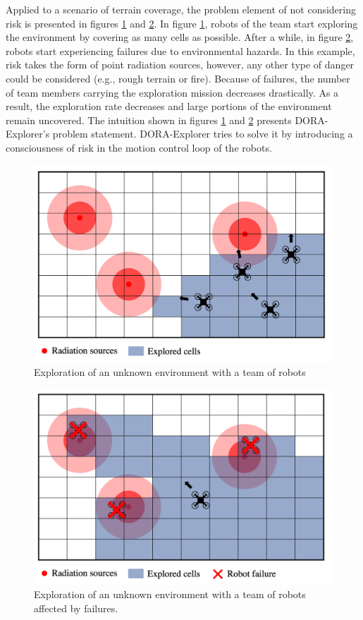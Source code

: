 Applied to a scenario of terrain coverage, the problem element of not considering risk is presented in figures \ref{statementDORA1} and \ref{statementDORA2}. In figure \ref{statementDORA1}, robots of the team start exploring the environment by covering as many cells as possible. After a while, in figure \ref{statementDORA2}, robots start experiencing failures due to environmental hazards. In this example, risk takes the form of point radiation sources, however, any other type of danger could be considered (e.g., rough terrain or fire). Because of failures, the number of team members carrying the exploration mission decreases drastically. As a result, the exploration rate decreases and large portions of the environment remain uncovered. The intuition shown in figures \ref{statementDORA1} and \ref{statementDORA2} presents DORA-Explorer's problem statement. DORA-Explorer tries to solve it by introducing a consciousness of risk in the motion control loop of the robots. 

\begin{figure}[htbp]
	\centering
    \includegraphics[width=0.70\columnwidth]{images/problemStatement1.png}
    \caption{Exploration of an unknown environment with a team of robots}
    \label{statementDORA1}
\end{figure}

\begin{figure}[htbp]
	\centering
    \includegraphics[width=0.70\columnwidth]{images/problemStatement2.png}
    \caption{Exploration of an unknown environment with a team of robots affected by failures.}
    \label{statementDORA2}
\end{figure}


